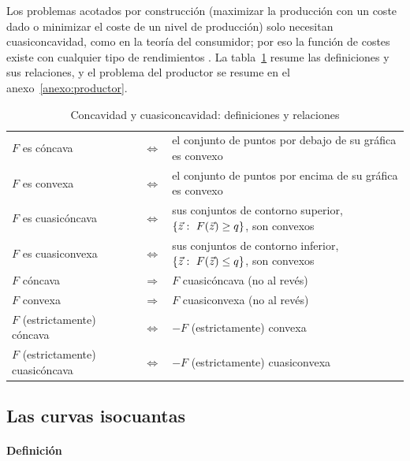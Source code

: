 \documentclass[11pt]{article}
\begin{document}
\begin{anotaciones}
Los problemas acotados por construcción (maximizar la producción con un coste dado o minimizar el coste de un nivel de producción) solo necesitan cuasiconcavidad, como en la teoría del consumidor; por eso la función de costes existe con cualquier tipo de rendimientos . La tabla~\ref{tab:concavidad} resume las definiciones y sus relaciones, y el problema del productor se resume en el anexo~\ref{anexo:productor}.

\begin{table}[H]
\centering\footnotesize
\caption{Concavidad y cuasiconcavidad: definiciones y relaciones}\label{tab:concavidad}
\begin{tabular}{@{}lcl@{}}
\toprule
$F$ es cóncava & $\Longleftrightarrow$ & el conjunto de puntos por debajo de su gráfica es convexo\\
$F$ es convexa & $\Longleftrightarrow$ & el conjunto de puntos por encima de su gráfica es convexo\\
$F$ es cuasicóncava & $\Longleftrightarrow$ & sus conjuntos de contorno superior, $\{\vec{z}:\ F(\vec{z})\geq q\}$, son convexos\\
$F$ es cuasiconvexa & $\Longleftrightarrow$ & sus conjuntos de contorno inferior, $\{\vec{z}:\ F(\vec{z})\leq q\}$, son convexos\\
$F$ cóncava & $\Longrightarrow$ & $F$ cuasicóncava (no al revés)\\
$F$ convexa & $\Longrightarrow$ & $F$ cuasiconvexa (no al revés)\\
$F$ (estrictamente) cóncava & $\Longleftrightarrow$ & $-F$ (estrictamente) convexa\\
$F$ (estrictamente) cuasicóncava & $\Longleftrightarrow$ & $-F$ (estrictamente) cuasiconvexa\\
\bottomrule
\end{tabular}
\end{table}
\end{anotaciones}

\subsection{Las curvas isocuantas}\label{sec:curvas-isocuantas}

\paragraph{Definición}
\end{document}
